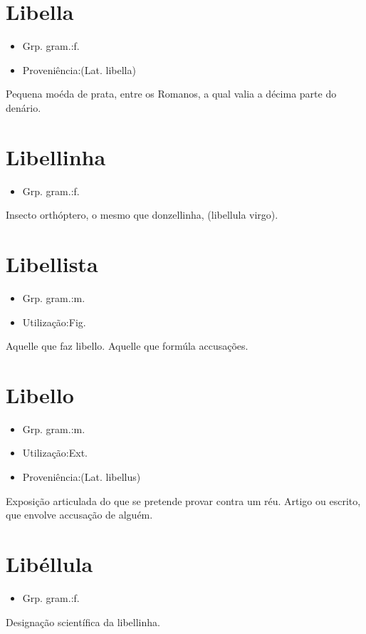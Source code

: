 \section{Libella}
\begin{itemize}
\item {Grp. gram.:f.}
\end{itemize}
\begin{itemize}
\item {Proveniência:(Lat. \textunderscore libella\textunderscore )}
\end{itemize}
Pequena moéda de prata, entre os Romanos, a qual valia a décima parte do denário.
\section{Libellinha}
\begin{itemize}
\item {Grp. gram.:f.}
\end{itemize}
Insecto orthóptero, o mesmo que \textunderscore donzellinha\textunderscore , (\textunderscore libellula virgo\textunderscore ).
\section{Libellista}
\begin{itemize}
\item {Grp. gram.:m.}
\end{itemize}
\begin{itemize}
\item {Utilização:Fig.}
\end{itemize}
Aquelle que faz libello.
Aquelle que formúla accusações.
\section{Libello}
\begin{itemize}
\item {Grp. gram.:m.}
\end{itemize}
\begin{itemize}
\item {Utilização:Ext.}
\end{itemize}
\begin{itemize}
\item {Proveniência:(Lat. \textunderscore libellus\textunderscore )}
\end{itemize}
Exposição articulada do que se pretende provar contra um réu.
Artigo ou escrito, que envolve accusação de alguém.
\section{Libéllula}
\begin{itemize}
\item {Grp. gram.:f.}
\end{itemize}
Designação scientífica da \textunderscore libellinha\textunderscore .
